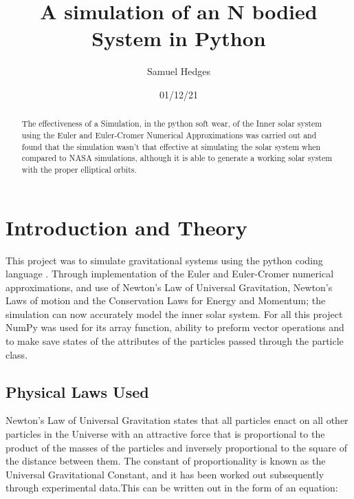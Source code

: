 \documentclass[a4paper,10pt]{article}
\begin{document}
\begin{figure}
\end{figure}




\title{A simulation of an N bodied System in Python  }
\author{Samuel Hedges}
\date{01/12/21}
 \maketitle
\begin{abstract}
The effectiveness of a Simulation, in the python soft wear, of the Inner solar system using the Euler and Euler-Cromer Numerical Approximations was carried out and found that the simulation wasn't that effective at simulating the solar system when compared to NASA simulations, although it is able to generate a working solar system with the proper elliptical orbits.
\end{abstract}
\newpage

\section{Introduction and Theory}
This project was to simulate gravitational systems using the python coding language \cite{Python}. Through implementation of the Euler \cite{Euler} and Euler-Cromer \cite{Euler-Cromer} numerical approximations, and use of Newton's Law of Universal Gravitation\cite{Universal Grav}, Newton's Laws of motion\cite{university physics} and the Conservation Laws for Energy and Momentum; the simulation can now accurately model the inner solar system. For all this project NumPy was used for its array function, ability to preform vector operations and to make save states of the attributes of the particles passed through the particle class. \cite{NumPy}

\subsection{Physical Laws Used}
Newton's Law of Universal Gravitation states that all particles enact on all other particles in the Universe with an attractive force that is proportional to the product of the masses of the particles and inversely proportional to the square of the distance between them. The constant of proportionality is known as the Universal Gravitational Constant, and it has been worked out subsequently through experimental data.This can be written out in the form of an equation:
\end{document}
